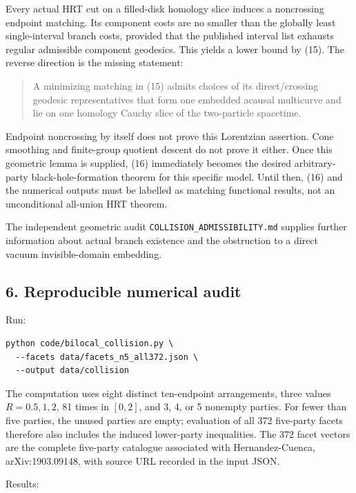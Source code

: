 \documentclass[11pt]{article}
\begin{document}
Every actual HRT cut on a filled-disk homology slice induces a
noncrossing endpoint matching. Its component costs are no smaller than
the globally least single-interval branch costs, provided that the
published interval list exhausts regular admissible component geodesics.
This yields a lower bound by (15). The reverse direction is the missing
statement:

\begin{quote}
A minimizing matching in (15) admits choices of its direct/crossing
geodesic representatives that form one embedded acausal multicurve and
lie on one homology Cauchy slice of the two-particle spacetime.
\end{quote}

Endpoint noncrossing by itself does not prove this Lorentzian assertion.
Cone smoothing and finite-group quotient descent do not prove it either.
Once this geometric lemma is supplied, (16) immediately becomes the
desired arbitrary-party black-hole-formation theorem for this specific
model. Until then, (16) and the numerical outputs must be labelled as
matching functional results, not an unconditional all-union HRT theorem.

The independent geometric audit \texttt{COLLISION\_\allowbreak ADMISSIBILITY.md}
supplies further information about actual branch existence and the
obstruction to a direct vacuum invisible-domain embedding.

\subsection{6. Reproducible numerical
audit}\label{reproducible-numerical-audit}

Run:

\begin{verbatim}
python code/bilocal_collision.py \
  --facets data/facets_n5_all372.json \
  --output data/collision
\end{verbatim}

The computation uses eight distinct ten-endpoint arrangements, three
values \(R=0.5,1,2\), 81 times in \([0,2]\), and 3, 4, or 5 nonempty
parties. For fewer than five parties, the unused parties are empty;
evaluation of all 372 five-party facets therefore also includes the
induced lower-party inequalities. The 372 facet vectors are the complete
five-party catalogue associated with Hernandez-Cuenca, arXiv:1903.09148,
with source URL recorded in the input JSON.

Results:
\end{document}
